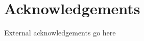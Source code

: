 \documentclass{article}
\begin{document}
\newpage
\section*{Acknowledgements}
\label{Acknowledgements}

External acknowledgements go here

\newpage
{}



%
\end{document}
